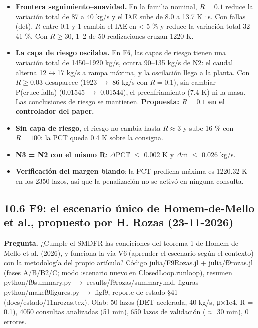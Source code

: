 \documentclass[11pt,a4paper]{article}
\newcommand{\codeus}{\textunderscore\allowbreak}
\newcommand{\code}[1]{{\small\ttfamily\let\_\codeus #1}}
\begin{document}
\begin{itemize}
\item \textbf{Frontera seguimiento–suavidad.} En la familia nominal, $R=0.1$ reduce la variación total de 87 a 40 kg/s y el IAE sube de 8.0 a 13.7 K·s. Con fallas (det), $R$ entre 0.1 y 1 cambia el IAE en < 5 \% y reduce la variación total 32–41 \%. Con $R\ge30$, 1–2 de 50 realizaciones cruzan 1220 K.
\item \textbf{La capa de riesgo oscilaba.} En F6, las capas de riesgo tienen una variación total de 1450–1920 kg/s, contra 90–135 kg/s de N2: el caudal alterna 12$\leftrightarrow$17 kg/s a rampa máxima, y la oscilación llega a la planta. Con $R\ge0.03$ desaparece (1923 $\to$ 86 kg/s con $R=0.1$), sin cambiar P(cruce|falla) (0.01545 $\to$ 0.01544), el preenfriamiento (7.4 K) ni la masa. Las conclusiones de riesgo se mantienen. \textbf{Propuesta: $R=0.1$ en el controlador del paper.}
\item \textbf{Sin capa de riesgo}, el riesgo no cambia hasta $R\approx3$ y sube 16 \% con $R=100$: la PCT queda 0.4 K sobre la consigna.
\item \textbf{N3 = N2 con el mismo R}: $\Delta$PCT $\le$ 0.002 K y $\Delta$ṁ $\le$ 0.026 kg/s.
\item \textbf{Verificación del margen blando}: la PCT predicha máxima es 1220.32 K en los 2350 lazos, así que la penalización no se activó en ninguna consulta.
\end{itemize}

\subsection*{10.6 F9: el escenario único de Homem-de-Mello et al., propuesto por H. Rozas (23-11-2026)}
\textbf{Pregunta.} ¿Cumple el SMDFR las condiciones del teorema 1 de Homem-de-Mello et al. (2026), y funciona la vía V6 (aprender el escenario según el contexto) con la metodología del propio artículo? Código \code{julia/F9Rozas.jl} + \code{julia/f9\_rozas.jl} (fases A/B/B2/C; modo \code{:scenario} nuevo en \code{ClosedLoop.run\_loop}), resumen \code{python/f9\_summary.py} $\to$ \code{results/f9\_rozas/summary.md}, figuras \code{python/make\_f9\_figures.py} $\to$ \code{fig\_f9\_*}, reporte de estado \S{}41 (\code{docs/estado/11n\_rozas.tex}). Olab: 50 lazos (DET acelerada, 40 kg/s, μ$\times$1e4, R = 0.1), 4050 consultas analizadas (51 min), 650 lazos de validación ($\approx$ 30 min), 0 errores.
\end{document}
